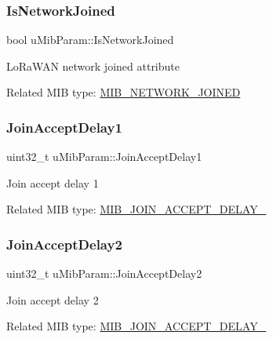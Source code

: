 \subsubsection{\texorpdfstring{Is\+Network\+Joined}{IsNetworkJoined}}
{\footnotesize\ttfamily bool u\+Mib\+Param\+::\+Is\+Network\+Joined}

Lo\+Ra\+W\+AN network joined attribute

Related M\+IB type\+: \hyperlink{group__LORAMAC_gga32ea83d13a3f5bb4b3ec2ace2319ab61a2e2a91bfbbb7bbbe1467eec239effbd0}{M\+I\+B\+\_\+\+N\+E\+T\+W\+O\+R\+K\+\_\+\+J\+O\+I\+N\+ED} \mbox{\label{unionuMibParam_aa13344525c4bcb94ed4c59938f567b32}} 
\subsubsection{\texorpdfstring{Join\+Accept\+Delay1}{JoinAcceptDelay1}}
{\footnotesize\ttfamily uint32\+\_\+t u\+Mib\+Param\+::\+Join\+Accept\+Delay1}

Join accept delay 1

Related M\+IB type\+: \hyperlink{group__LORAMAC_gga32ea83d13a3f5bb4b3ec2ace2319ab61a3fa6b527109f8a6d5994ddaf7e9b0bd1}{M\+I\+B\+\_\+\+J\+O\+I\+N\+\_\+\+A\+C\+C\+E\+P\+T\+\_\+\+D\+E\+L\+A\+Y\+\_} \mbox{\label{unionuMibParam_ab5aab1064c3e6476fb342d30de7abc7b}} 
\subsubsection{\texorpdfstring{Join\+Accept\+Delay2}{JoinAcceptDelay2}}
{\footnotesize\ttfamily uint32\+\_\+t u\+Mib\+Param\+::\+Join\+Accept\+Delay2}

Join accept delay 2

Related M\+IB type\+: \hyperlink{group__LORAMAC_gga32ea83d13a3f5bb4b3ec2ace2319ab61aa1ca7d4484b41008a69d5d786cfd6a20}{M\+I\+B\+\_\+\+J\+O\+I\+N\+\_\+\+A\+C\+C\+E\+P\+T\+\_\+\+D\+E\+L\+A\+Y\+\_} \mbox{\label{unionuMibParam_a9fdb2320488295a980588cb61f6fd5ea}} 
